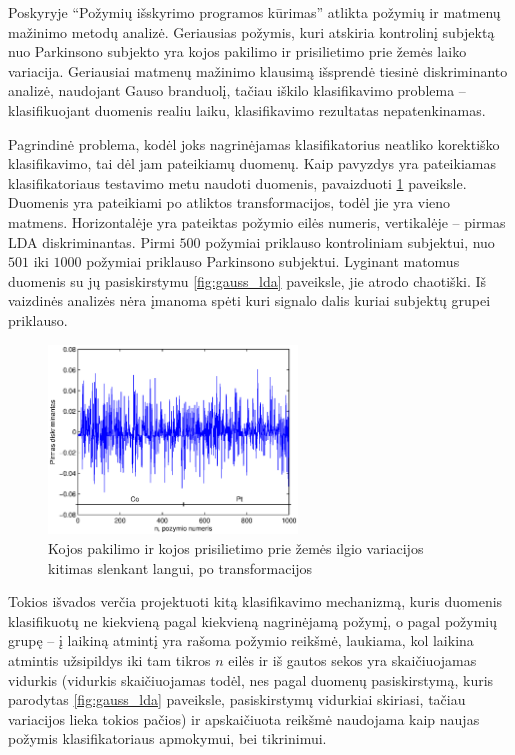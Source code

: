 \documentclass[]{vgtuef}
\begin{document}
Poskyryje ``Požymių išskyrimo programos kūrimas'' atlikta požymių ir matmenų mažinimo metodų analizė. Geriausias požymis, kuri atskiria kontrolinį subjektą nuo Parkinsono subjekto yra kojos pakilimo ir prisilietimo prie žemės laiko variacija. Geriausiai matmenų mažinimo klausimą išsprendė tiesinė diskriminanto analizė, naudojant Gauso branduolį, tačiau iškilo klasifikavimo problema -- klasifikuojant duomenis realiu laiku, klasifikavimo rezultatas nepatenkinamas. 

Pagrindinė problema, kodėl joks nagrinėjamas klasifikatorius neatliko korektiško klasifikavimo, tai dėl jam pateikiamų duomenų. Kaip pavyzdys yra pateikiamas klasifikatoriaus testavimo metu naudoti duomenis, pavaizduoti \ref{fig:testing_sample} paveiksle. Duomenis yra pateikiami po atliktos transformacijos, todėl jie yra vieno matmens. Horizontalėje yra pateiktas požymio eilės numeris, vertikalėje -- pirmas LDA diskriminantas. Pirmi $500$ požymiai priklauso kontroliniam subjektui, nuo $501$ iki $1000$ požymiai priklauso Parkinsono subjektui. Lyginant matomus duomenis su jų pasiskirstymu \ref{fig:gauss_lda} paveiksle, jie atrodo chaotiški. Iš vaizdinės analizės nėra įmanoma spėti kuri signalo dalis kuriai subjektų grupei priklauso. 

\begin{figure}
	\centering
	\includegraphics[width=250px]{figures/11_sample_testing}
	\caption{Kojos pakilimo ir kojos prisilietimo prie žemės ilgio variacijos kitimas slenkant langui, po transformacijos}
	\label{fig:testing_sample}
\end{figure}

Tokios išvados verčia projektuoti kitą klasifikavimo mechanizmą, kuris duomenis klasifikuotų ne kiekvieną pagal kiekvieną nagrinėjamą požymį, o pagal požymių grupę -- į laikiną atmintį yra rašoma požymio reikšmė, laukiama, kol laikina atmintis užsipildys iki tam tikros $n$ eilės ir iš gautos sekos yra skaičiuojamas vidurkis (vidurkis skaičiuojamas todėl, nes pagal duomenų pasiskirstymą, kuris parodytas \ref{fig:gauss_lda} paveiksle, pasiskirstymų vidurkiai skiriasi, tačiau variacijos lieka tokios pačios) ir apskaičiuota reikšmė naudojama kaip naujas požymis klasifikatoriaus apmokymui, bei tikrinimui. 
\end{document}
